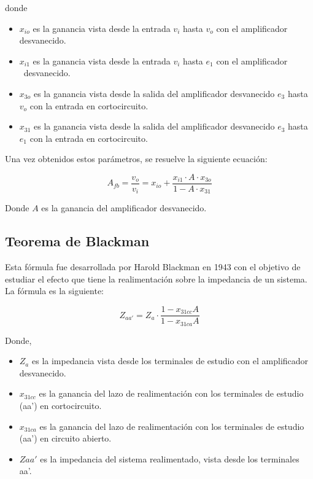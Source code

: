 donde

\begin{itemize}
    \item $x_{io}$ es la ganancia vista desde la entrada $v_i$ hasta $v_o$ con el amplificador
desvanecido.
    \item $x_{i1}$ es la ganancia vista desde la entrada $v_i$ hasta $e_1$ con el amplificador \
desvanecido.
    \item $x_{3o}$ es la ganancia vista desde la salida del amplificador desvanecido $e_3$
hasta $v_o$ con la entrada en cortocircuito.
    \item $x_{31}$ es la ganancia vista desde la salida del amplificador desvanecido $e_3$
hasta $e_1$ con la entrada en cortocircuito.
\end{itemize}

Una vez obtenidos estos parámetros, se resuelve la siguiente ecuación:

\begin{equation}
    \boxed{A_{fb} = \frac{v_o}{v_i} = x_{io} + \frac{x_{i1} \cdot A \cdot x_{3o}}{1 - A \cdot x_{31}}}
    \label{eq:mt-MAD}
\end{equation}

Donde $A$ es la ganancia del amplificador desvanecido.

\subsection{Teorema de Blackman}

Esta fórmula fue desarrollada por Harold Blackman en 1943 con el objetivo de estudiar el efecto que tiene la realimentación sobre la impedancia de
un sistema. La fórmula es la siguiente:

\begin{equation}
    \boxed{Z_{aa'} = Z_a \cdot \frac{1 - x_{31cc}A}{1 - x_{31ca}A}}
    \label{eq:mt-Blackman}
\end{equation}

Donde,

\begin{itemize}
    \item $Z_a$ es la impedancia vista desde los terminales de estudio con el amplificador desvanecido.
    \item $x_{31cc}$ es la ganancia del lazo de realimentación con los terminales de estudio (aa') en cortocircuito.
    \item $x_{31ca}$ es la ganancia del lazo de realimentación con los terminales de
estudio (aa') en circuito abierto.
\item $Z{aa'}$ es la impedancia del sistema realimentado, vista desde los terminales aa'.
\end{itemize}

